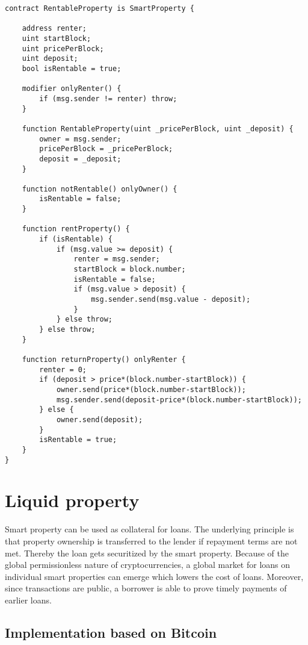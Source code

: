 \begin{lstlisting}[breaklines,basicstyle=\tiny]
contract RentableProperty is SmartProperty {
    
    address renter;
    uint startBlock;
    uint pricePerBlock;
    uint deposit;
    bool isRentable = true;
    
    modifier onlyRenter() {
        if (msg.sender != renter) throw;
    } 
    
    function RentableProperty(uint _pricePerBlock, uint _deposit) {
        owner = msg.sender;
        pricePerBlock = _pricePerBlock;
        deposit = _deposit;
    }
    
    function notRentable() onlyOwner() {
        isRentable = false;
    }
    
    function rentProperty() {
        if (isRentable) {
            if (msg.value >= deposit) {
                renter = msg.sender;
                startBlock = block.number;
                isRentable = false;
                if (msg.value > deposit) {
                    msg.sender.send(msg.value - deposit);
                }
            } else throw;
        } else throw;
    }
    
    function returnProperty() onlyRenter {
        renter = 0;
        if (deposit > price*(block.number-startBlock)) {
            owner.send(price*(block.number-startBlock));
            msg.sender.send(deposit-price*(block.number-startBlock));
        } else {
            owner.send(deposit);
        }
        isRentable = true;
    }
}
\end{lstlisting}

\section{Liquid property}

Smart property can be used as collateral for loans. The underlying principle is that property ownership is transferred to the lender if repayment terms are not met. Thereby the loan gets securitized by the smart property. Because of the global permissionless nature of cryptocurrencies, a global market for loans on individual smart properties can emerge which lowers the cost of loans. Moreover, since transactions are public, a borrower is able to prove timely payments of earlier loans. 

\subsection{Implementation based on Bitcoin}

